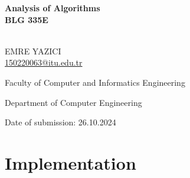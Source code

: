 \documentclass[12pt]{report}
\author{Emre YAZICI}
\numberwithin{figure}{chapter}
\begin{document}
\begin{titlepage}
\begin{center}
    \vspace*{-3cm}
    
    \vspace{2.3cm}
    

    \vspace{1cm}
    {\textbf{Analysis of Algorithms\\}}
    \vspace{0.3cm}
    {\textbf{BLG 335E\\}}
    \vspace{2.4cm}
    
    {}\\
    EMRE YAZICI \\ \href{mailto:150220063@itu.edu.tr}{150220063@itu.edu.tr}\\
    \vspace{0.9cm}

\end{center}
{\raggedleft\vfill{\begin{singlespace}
     Faculty of Computer and Informatics Engineering\\
\end{singlespace}
 Department of Computer Engineering\\
 \begin{singlespace}
 Date of submission: 26.10.2024\\
 
 
 \end{singlespace}
}\par
}
\end{titlepage}

\newpage

\chapter{Implementation}
 
\end{document}
